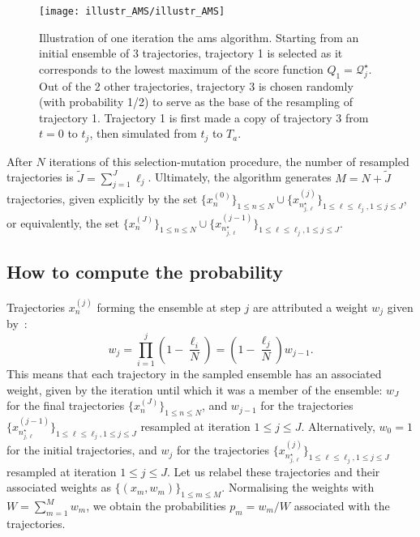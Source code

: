 \begin{figure}
  \centering
  \texttt{[image: illustr\_AMS/illustr\_AMS]}
  \caption{Illustration of one iteration the \ac{ams} algorithm. Starting from an initial ensemble of 3 trajectories, trajectory 1 is selected as it corresponds to the lowest maximum of the score function $Q_1 = \mathcal{Q}_{j}^\star$. Out of the 2 other trajectories, trajectory 3 is chosen randomly (with probability 1/2) to serve as the base of the resampling of trajectory 1. Trajectory 1 is first made a copy of trajectory 3 from $t=0$ to $t_j$, then simulated from $t_j$ to $T_a$.}
  \label{fig:AMS_schema}
\end{figure}

After $N$ iterations of this selection-mutation procedure, the number of resampled trajectories is
$\tilde{J} = \sum_{j=1}^J \ell_j$.
Ultimately, the algorithm generates $M=N+\tilde{J}$ trajectories, given explicitly by the set $\{x_n^{(0)}\}_{1 \leq n \leq N} \cup \{ x_{n_{j,\ell}^\star}^{(j)}\}_{1 \leq \ell \leq \ell_j, 1 \leq j \leq J}$, or equivalently, the set $\{x_n^{(J)}\}_{1 \leq n \leq N} \cup \{ x_{n_{j,\ell}^\star}^{(j-1)}\}_{1 \leq \ell \leq \ell_j, 1 \leq j \leq J}$.
\subsection{How to compute the probability}
Trajectories $x_n^{(j)}$ forming the ensemble at step $j$ are attributed a weight $w_j$ given by~\cite{Cerou2007,Cerou2011,Brehier2016a}:
\begin{equation}
  w_j = \prod_{i=1}^j \left( 1 - \frac{\ell_i}{N}\right)=\left( 1 - \frac{\ell_j}{N}\right)w_{j-1}.
\end{equation}
This means that each trajectory in the sampled ensemble has an associated weight, given by the iteration until which it was a member of the ensemble: $w_J$ for the final trajectories $\{x_n^{(J)}\}_{1 \leq n \leq N}$, and $w_{j-1}$ for the trajectories $\{ x_{n_{j,\ell}^\star}^{(j-1)}\}_{1 \leq \ell \leq \ell_j, 1 \leq j \leq J}$ resampled at iteration $1 \leq j \leq J$.
Alternatively, $w_0 = 1$ for the initial trajectories, and $w_j$ for the trajectories $\{ x_{n_{j,\ell}^\star}^{(j)}\}_{1 \leq \ell \leq \ell_j, 1 \leq j \leq J}$ resampled at iteration $1 \leq j \leq J$.
Let us relabel these trajectories and their associated weights as $\{(x_m,w_m)\}_{1 \leq m \leq M}$.
Normalising the weights with $W=\sum_{m=1}^M w_m$, we obtain the probabilities $p_m=w_m/W$ associated with the trajectories.
